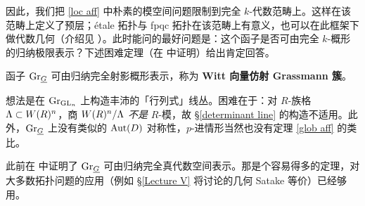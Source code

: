 因此，我们把 \eqref{loc aff} 中朴素的模空间问题限制到完全 $k$-代数范畴上。这样在该范畴上定义了预层；\'etale 拓扑与 fpqc 拓扑在该范畴上有意义，也可以在此框架下做代数几何（介绍见 \cite[Appendix A]{Z14}）。此时能问的最好问题是：这个函子是否可由完全 $k$-概形的归纳极限表示？下述困难定理（在 \cite{BS} 中证明）给出肯定回答。

\begin{thm}
函子 ${\operatorname{Gr}}_{\underline G}$ 可由归纳完全射影概形表示，称为 \textbf{Witt 向量仿射 Grassmann 簇}。
\end{thm}

想法是在 ${\operatorname{Gr}}_{{\operatorname{GL}}_n}$ 上构造丰沛的「行列式」线丛。困难在于：对 $R$-族格 ${\Lambda}\subset W(R)^n$，商 $W(R)^n/{\Lambda}$ \emph{不是} $R$-模，故 \S\ref{determinant line} 的构造不适用。此外，${\operatorname{Gr}}_{\underline G}$ 上没有类似的 ${\operatorname{Aut}}(D)$ 对称性，$p$-进情形当然也没有定理 \ref{glob aff} 的类比。

此前在 \cite[\S~1]{Z14} 中证明了 ${\operatorname{Gr}}_{\underline G}$ 可由归纳完全真代数空间表示。那是个容易得多的定理，对大多数拓扑问题的应用（例如 \S\ref{Lecture V} 将讨论的几何 Satake 等价）已经够用。
